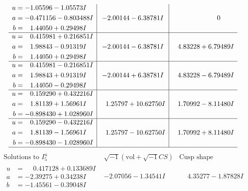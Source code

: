 \documentclass[1p]{elsarticle_modified}
\theoremstyle{definition}
\newcommand{\I}{\sqrt{-1}}
\begin{document}
$$\begin{array}{c|c|c}
\begin{aligned}
u &= -1.05596 - 1.05573 I \\
a &= -0.471156 - 0.803488 I \\
b &= \phantom{-}1.44050 + 0.29498 I\end{aligned}
 & -2.00144 - 6.38781 I & \phantom{-0.000000 } 0 \\ \hline\begin{aligned}
u &= \phantom{-}0.415981 + 0.216851 I \\
a &= \phantom{-}1.98843 - 0.91319 I \\
b &= \phantom{-}1.44050 + 0.29498 I\end{aligned}
 & -2.00144 - 6.38781 I & \phantom{-}4.83228 + 6.79489 I \\ \hline\begin{aligned}
u &= \phantom{-}0.415981 - 0.216851 I \\
a &= \phantom{-}1.98843 + 0.91319 I \\
b &= \phantom{-}1.44050 - 0.29498 I\end{aligned}
 & -2.00144 + 6.38781 I & \phantom{-}4.83228 - 6.79489 I \\ \hline\begin{aligned}
u &= \phantom{-}0.159290 + 0.432216 I \\
a &= \phantom{-}1.81139 + 1.56961 I \\
b &= -0.898430 + 1.028960 I\end{aligned}
 & \phantom{-}1.25797 + 10.62750 I & \phantom{-}1.70992 - 8.11480 I \\ \hline\begin{aligned}
u &= \phantom{-}0.159290 - 0.432216 I \\
a &= \phantom{-}1.81139 - 1.56961 I \\
b &= -0.898430 - 1.028960 I\end{aligned}
 & \phantom{-}1.25797 - 10.62750 I & \phantom{-}1.70992 + 8.11480 I\\
 \hline 
 \end{array}$$\newpage$$\begin{array}{c|c|c}  
\text{Solutions to }I^u_{5}& \I (\text{vol} + \sqrt{-1}CS) & \text{Cusp shape}\\
 \hline 
\begin{aligned}
u &= \phantom{-}0.417128 + 0.133689 I \\
a &= -2.39275 + 0.34238 I \\
b &= -1.45561 - 0.39048 I\end{aligned}
 & -2.07056 - 1.34541 I & \phantom{-}4.35277 - 1.87828 I \\ \hline\begin{aligned}

\end{aligned}
\end{array}$$
\end{document}
